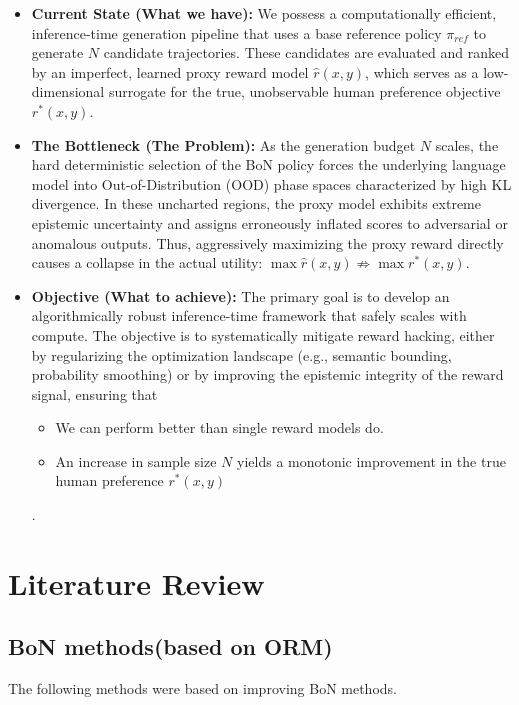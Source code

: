 \documentclass[a4paper,11pt]{article}
\begin{document}
\begin{itemize}
    \item \textbf{Current State (What we have):} We possess a computationally efficient, inference-time generation pipeline that uses a base reference policy $\pi_{ref}$ to generate $N$ candidate trajectories. These candidates are evaluated and ranked by an imperfect, learned proxy reward model $\hat{r}(x, y)$, which serves as a low-dimensional surrogate for the true, unobservable human preference objective $r^*(x, y)$.
    
    \item \textbf{The Bottleneck (The Problem):} As the generation budget $N$ scales, the hard deterministic selection of the BoN policy forces the underlying language model into Out-of-Distribution (OOD) phase spaces characterized by high KL divergence. In these uncharted regions, the proxy model exhibits extreme epistemic uncertainty and assigns erroneously inflated scores to adversarial or anomalous outputs. Thus, aggressively maximizing the proxy reward directly causes a collapse in the actual utility: $\max \hat{r}(x, y) \not\Rightarrow \max r^*(x, y)$.
    
    \item \textbf{Objective (What to achieve):} The primary goal is to develop an algorithmically robust inference-time framework that safely scales with compute. The objective is to systematically mitigate reward hacking, either by regularizing the optimization landscape (e.g., semantic bounding, probability smoothing) or by improving the epistemic integrity of the reward signal, ensuring that
    \begin{itemize}
        \item We can perform better than single reward models do.
        \item An increase in sample size $N$ yields a monotonic improvement in the true human preference $r^*(x, y)$
    \end{itemize}.
\end{itemize}

\section{Literature Review}
\subsection{BoN methods(based on ORM)}
The following methods were based on improving BoN methods.
\end{document}

